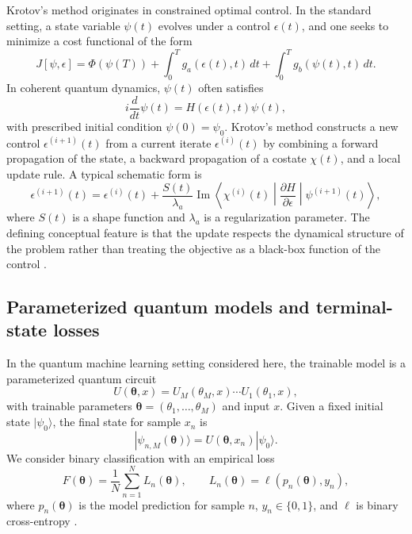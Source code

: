 \documentclass[aps,prb,10pt,twocolumn,superscriptaddress]{revtex4-2}
\begin{document}
Krotov's method originates in constrained optimal control. In the standard setting, a state variable \(\psi(t)\) evolves under a control \(\epsilon(t)\), and one seeks to minimize a cost functional of the form
\begin{equation}
J[\psi,\epsilon]
=
\Phi(\psi(T))
+
\int_0^T g_a(\epsilon(t),t)\,dt
+
\int_0^T g_b(\psi(t),t)\,dt.
\label{eq:generic_cost}
\end{equation}
In coherent quantum dynamics, \(\psi(t)\) often satisfies
\begin{equation}
i \frac{d}{dt}\psi(t)=H(\epsilon(t),t)\psi(t),
\label{eq:schrodinger}
\end{equation}
with prescribed initial condition \(\psi(0)=\psi_0\). Krotov's method constructs a new control \(\epsilon^{(i+1)}(t)\) from a current iterate \(\epsilon^{(i)}(t)\) by combining a forward propagation of the state, a backward propagation of a costate \(\chi(t)\), and a local update rule. A typical schematic form is
\begin{equation}
\epsilon^{(i+1)}(t)
=
\epsilon^{(i)}(t)
+
\frac{S(t)}{\lambda_a}
\operatorname{Im}
\left\langle
\chi^{(i)}(t)
\middle|
\frac{\partial H}{\partial \epsilon}
\middle|
\psi^{(i+1)}(t)
\right\rangle,
\label{eq:krotov_update}
\end{equation}
where \(S(t)\) is a shape function and \(\lambda_a\) is a regularization parameter. The defining conceptual feature is that the update respects the dynamical structure of the problem rather than treating the objective as a black-box function of the control \cite{SklarzTannor2002,PalaoKosloff2003,ReichNdongKoch2012,WerschnikGross2007,BrifChakrabartiRabitz2010}.

\subsection{Parameterized quantum models and terminal-state losses}

In the quantum machine learning setting considered here, the trainable model is a parameterized quantum circuit
\begin{equation}
U(\bm{\theta},x)=U_M(\theta_M,x)\cdots U_1(\theta_1,x),
\label{eq:circuit}
\end{equation}
with trainable parameters \(\bm{\theta}=(\theta_1,\dots,\theta_M)\) and input \(x\). Given a fixed initial state \(|\psi_0\rangle\), the final state for sample \(x_n\) is
\begin{equation}
|\psi_{n,M}(\bm{\theta})\rangle
=
U(\bm{\theta},x_n)|\psi_0\rangle.
\label{eq:final_state}
\end{equation}
We consider binary classification with an empirical loss
\begin{equation}
F(\bm{\theta})=\frac{1}{N}\sum_{n=1}^N L_n(\bm{\theta}),
\qquad
L_n(\bm{\theta})=\ell(p_n(\bm{\theta}),y_n),
\label{eq:empirical_loss}
\end{equation}
where \(p_n(\bm{\theta})\) is the model prediction for sample \(n\), \(y_n\in\{0,1\}\), and \(\ell\) is binary cross-entropy \cite{MitaraiEtAl2018QCL,SchuldEtAl2020CircuitCentric,PerezSalinasEtAl2020DataReupload}.
\end{document}
